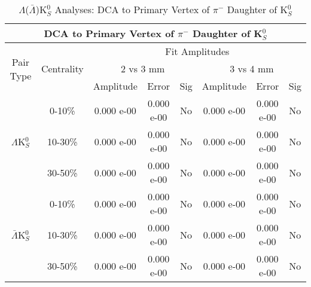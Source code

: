 \documentclass[../AnalysisNoteJBuxton.tex]{subfiles}
\begin{document}
\begin{table}
 \centering
 \begin{tabular}{|c|c|c|c|c||c|c|c|}
  \multicolumn{8}{c}{DCA to Primary Vertex of $\pi^{-}$ Daughter of K$^{0}_{S}$} \\
  \hline
  \multirow{3}{*}{Pair Type} & \multirow{3}{*}{Centrality} & \multicolumn{6}{c|}{Fit Amplitudes} \\
  \cline{3-8}
   & & \multicolumn{3}{c||}{2 vs 3 mm} & \multicolumn{3}{c|}{3 vs 4 mm} \\
  \cline{3-8}
   & & Amplitude & Error & Sig & Amplitude & Error & Sig \\
  \hline  
  \multirow{3}{*}{$\Lambda$K$^{0}_{S}$}  
   &  0-10\% & 0.000 e-00 & 0.000 e-00 & No & 0.000 e-00 & 0.000 e-00 & No \\
   & 10-30\% & 0.000 e-00 & 0.000 e-00 & No & 0.000 e-00 & 0.000 e-00 & No \\
   & 30-50\% & 0.000 e-00 & 0.000 e-00 & No & 0.000 e-00 & 0.000 e-00 & No \\
  \hline  
  \multirow{3}{*}{$\bar{\Lambda}$K$^{0}_{S}$}  
   &  0-10\% & 0.000 e-00 & 0.000 e-00 & No & 0.000 e-00 & 0.000 e-00 & No \\
   & 10-30\% & 0.000 e-00 & 0.000 e-00 & No & 0.000 e-00 & 0.000 e-00 & No \\
   & 30-50\% & 0.000 e-00 & 0.000 e-00 & No & 0.000 e-00 & 0.000 e-00 & No \\
  \hline
 \end{tabular}
 \caption{$\Lambda$($\bar{\Lambda}$)K$^{0}_{S}$ Analyses: DCA to Primary Vertex of $\pi^{-}$ Daughter of K$^{0}_{S}$}
 \label{tab:DcaToPrimVertexNegPionDaughtOfK0LamK0}
\end{table}
\end{document}
